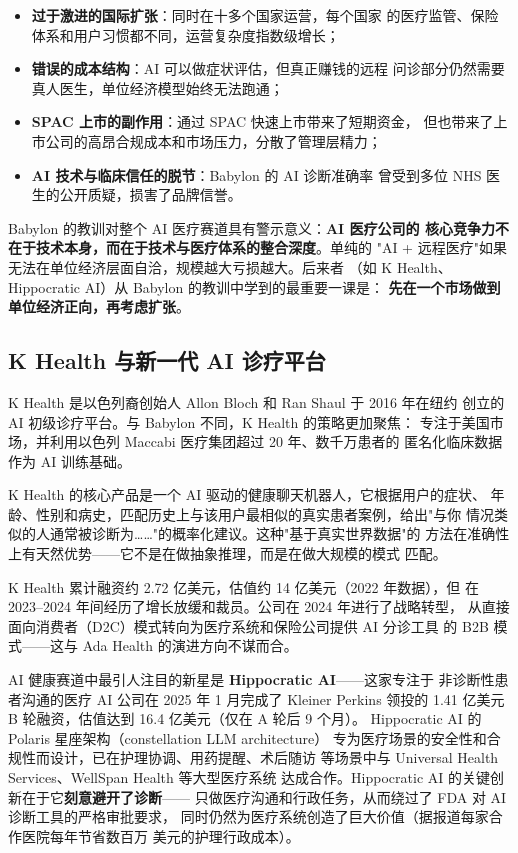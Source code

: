 \begin{itemize}
  \item \textbf{过于激进的国际扩张}：同时在十多个国家运营，每个国家
    的医疗监管、保险体系和用户习惯都不同，运营复杂度指数级增长；
  \item \textbf{错误的成本结构}：AI 可以做症状评估，但真正赚钱的远程
    问诊部分仍然需要真人医生，单位经济模型始终无法跑通；
  \item \textbf{SPAC 上市的副作用}：通过 SPAC 快速上市带来了短期资金，
    但也带来了上市公司的高昂合规成本和市场压力，分散了管理层精力；
  \item \textbf{AI 技术与临床信任的脱节}：Babylon 的 AI 诊断准确率
    曾受到多位 NHS 医生的公开质疑，损害了品牌信誉。
\end{itemize}

Babylon 的教训对整个 AI 医疗赛道具有警示意义：\textbf{AI 医疗公司的
核心竞争力不在于技术本身，而在于技术与医疗体系的整合深度}。单纯的
"AI + 远程医疗"如果无法在单位经济层面自洽，规模越大亏损越大。后来者
（如 K Health、Hippocratic AI）从 Babylon 的教训中学到的最重要一课是：
\textbf{先在一个市场做到单位经济正向，再考虑扩张}。


\subsection{K Health 与新一代 AI 诊疗平台}
\label{subsec:k-health}

K Health 是以色列裔创始人 Allon Bloch 和 Ran Shaul 于 2016 年在纽约
创立的 AI 初级诊疗平台。与 Babylon 不同，K Health 的策略更加聚焦：
专注于美国市场，并利用以色列 Maccabi 医疗集团超过 20 年、数千万患者的
匿名化临床数据作为 AI 训练基础。

K Health 的核心产品是一个 AI 驱动的健康聊天机器人，它根据用户的症状、
年龄、性别和病史，匹配历史上与该用户最相似的真实患者案例，给出"与你
情况类似的人通常被诊断为……"的概率化建议。这种"基于真实世界数据"的
方法在准确性上有天然优势——它不是在做抽象推理，而是在做大规模的模式
匹配。

K Health 累计融资约 2.72 亿美元，估值约 14 亿美元（2022 年数据），但
在 2023--2024 年间经历了增长放缓和裁员。公司在 2024 年进行了战略转型，
从直接面向消费者（D2C）模式转向为医疗系统和保险公司提供 AI 分诊工具
的 B2B 模式——这与 Ada Health 的演进方向不谋而合。

AI 健康赛道中最引人注目的新星是 \textbf{Hippocratic AI}——这家专注于
非诊断性患者沟通的医疗 AI 公司在 2025 年 1 月完成了 Kleiner Perkins
领投的 1.41 亿美元 B 轮融资，估值达到 16.4 亿美元（仅在 A 轮后 9 个月）。
Hippocratic AI 的 Polaris 星座架构（constellation LLM architecture）
专为医疗场景的安全性和合规性而设计，已在护理协调、用药提醒、术后随访
等场景中与 Universal Health Services、WellSpan Health 等大型医疗系统
达成合作。Hippocratic AI 的关键创新在于它\textbf{刻意避开了诊断}——
只做医疗沟通和行政任务，从而绕过了 FDA 对 AI 诊断工具的严格审批要求，
同时仍然为医疗系统创造了巨大价值（据报道每家合作医院每年节省数百万
美元的护理行政成本）。

